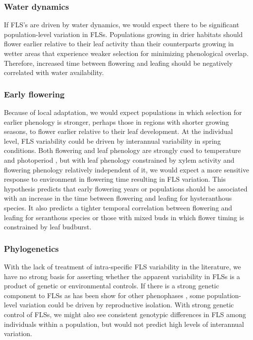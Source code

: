 \documentclass{article}
\begin{document}
\subsubsection*{Water dynamics} 
\indent\indent If FLS's are driven by water dynamics, we would expect there to be significant population-level variation in FLSs. Populations growing in drier habitats should flower earlier relative to their leaf activity than their counterparts growing in wetter areas that experience weaker selection for minimizing phenological overlap. Therefore, increased time between flowering and leafing should be negatively correlated with water availability. %
\subsubsection*{Early flowering} 
\indent\indent  Because of local adaptation, we would expect populations in which selection for earlier phenology is stronger, perhaps those in regions with shorter growing seasons, to flower earlier relative to their leaf development.  At the individual level, FLS variability could be driven by interannual variability in spring conditions. Both flowering and leaf phenology are strongly cued to temperature and photoperiod \citep{Flynn2018,Rathcke_1985}, but with leaf phenology constrained by xylem activity and flowering phenology relatively independent of it, we would expect a more sensitive response to environment in flowering time resulting in FLS variation. This hypothesis predicts that early flowering years or populations should be associated with an increase in the time between flowering and leafing for hysteranthous species. It also predicts a tighter temporal correlation between flowering and leafing for seranthous species or those with mixed buds in which flower timing is constrained by leaf budburst.
\subsubsection*{Phylogenetics} 
\indent\indent With the lack of treatment of intra-specific FLS variability in the literature, we have no strong basis for asserting whether the apparent variability in FLSs is a product of genetic or environmental controls. If there is a strong genetic component to FLSs as has been show for other phenophases \citep{Wilczek2010}, some population-level variation could be driven by reproductive isolation. With strong genetic control of FLSs, we might also see consistent genotypic differences in FLS among individuals within a population, but would not predict high levels of interannual variation.\\
\end{document}
